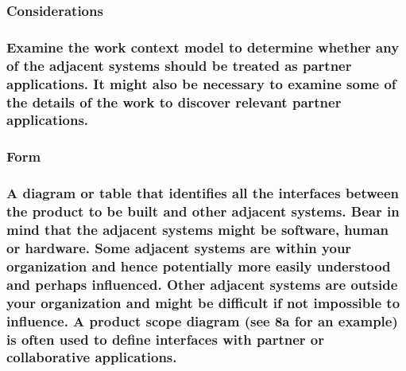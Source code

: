 \documentclass[
]{article}
\begin{document}
\hypertarget{considerations-4}{%
\subsubsection{Considerations}\label{considerations-4}}

\hypertarget{examine-the-work-context-model-to-determine-whether-any-of-the-adjacent-systems-should-be-treated-as-partner-applications.-it-might-also-be-necessary-to-examine-some-of-the-details-of-the-work-to-discover-relevant-partner-applications.}{%
\subsubsection{Examine the work context model to determine whether any
of the adjacent systems should be treated as partner applications. It
might also be necessary to examine some of the details of the work to
discover relevant partner
applications.}\label{examine-the-work-context-model-to-determine-whether-any-of-the-adjacent-systems-should-be-treated-as-partner-applications.-it-might-also-be-necessary-to-examine-some-of-the-details-of-the-work-to-discover-relevant-partner-applications.}}

\hypertarget{form-12}{%
\subsubsection{Form}\label{form-12}}

\hypertarget{a-diagram-or-table-that-identifies-all-the-interfaces-between-the-product-to-be-built-and-other-adjacent-systems.-bear-in-mind-that-the-adjacent-systems-might-be-software-human-or-hardware.-some-adjacent-systems-are-within-your-organization-and-hence-potentially-more-easily-understood-and-perhaps-influenced.-other-adjacent-systems-are-outside-your-organization-and-might-be-difficult-if-not-impossible-to-influence.-a-product-scope-diagram-see-8a-for-an-example-is-often-used-to-define-interfaces-with-partner-or-collaborative-applications.}{%
\subsubsection{A diagram or table that identifies all the interfaces
between the product to be built and other adjacent systems. Bear in mind
that the adjacent systems might be software, human or hardware. Some
adjacent systems are within your organization and hence potentially more
easily understood and perhaps influenced. Other adjacent systems are
outside your organization and might be difficult if not impossible to
influence. A product scope diagram (see 8a for an example) is often used
to define interfaces with partner or collaborative
applications.}\label{a-diagram-or-table-that-identifies-all-the-interfaces-between-the-product-to-be-built-and-other-adjacent-systems.-bear-in-mind-that-the-adjacent-systems-might-be-software-human-or-hardware.-some-adjacent-systems-are-within-your-organization-and-hence-potentially-more-easily-understood-and-perhaps-influenced.-other-adjacent-systems-are-outside-your-organization-and-might-be-difficult-if-not-impossible-to-influence.-a-product-scope-diagram-see-8a-for-an-example-is-often-used-to-define-interfaces-with-partner-or-collaborative-applications.}}
\end{document}
